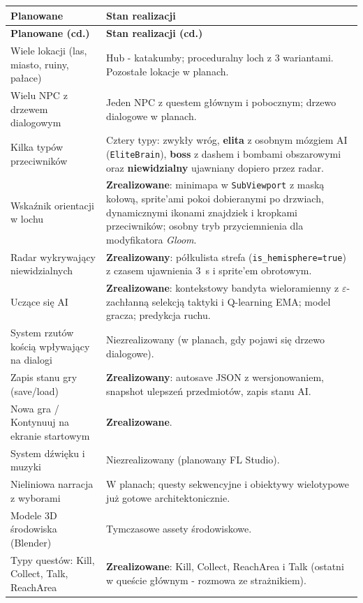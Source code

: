\begin{longtable}{|p{}|p{}|}
\hline
\textbf{Planowane} & \textbf{Stan realizacji} \\
\hline
\endfirsthead
\hline
\textbf{Planowane (cd.)} & \textbf{Stan realizacji (cd.)} \\
\hline
\endhead
\hline
\endfoot
Wiele lokacji (las, miasto, ruiny, pałace) & Hub - katakumby; proceduralny loch z 3 wariantami. Pozostałe lokacje w planach. \\
\hline
Wielu NPC z drzewem dialogowym & Jeden NPC z questem głównym i pobocznym; drzewo dialogowe w planach. \\
\hline
Kilka typów przeciwników & Cztery typy: zwykły wróg, \textbf{elita} z osobnym mózgiem AI (\texttt{EliteBrain}), \textbf{boss} z dashem i bombami obszarowymi oraz \textbf{niewidzialny} ujawniany dopiero przez radar. \\
\hline
Wskaźnik orientacji w lochu & \textbf{Zrealizowane}: minimapa w \texttt{SubViewport} z maską kołową, sprite'ami pokoi dobieranymi po drzwiach, dynamicznymi ikonami znajdziek i kropkami przeciwników; osobny tryb przyciemnienia dla modyfikatora \textit{Gloom}. \\
\hline
Radar wykrywający niewidzialnych & \textbf{Zrealizowany}: półkulista strefa (\texttt{is\_hemisphere=true}) z czasem ujawnienia 3~s i sprite'em obrotowym. \\
\hline
Uczące się AI & \textbf{Zrealizowane}: kontekstowy bandyta wieloramienny z $\varepsilon$-zachłanną selekcją taktyki i Q-learning EMA; model gracza; predykcja ruchu. \\
\hline
System rzutów kością wpływający na dialogi & Niezrealizowany (w planach, gdy pojawi się drzewo dialogowe). \\
\hline
Zapis stanu gry (save/load) & \textbf{Zrealizowany}: autosave JSON z wersjonowaniem, snapshot ulepszeń przedmiotów, zapis stanu AI. \\
\hline
Nowa gra / Kontynuuj na ekranie startowym & \textbf{Zrealizowane}. \\
\hline
System dźwięku i muzyki & Niezrealizowany (planowany FL Studio). \\
\hline
Nieliniowa narracja z wyborami & W planach; questy sekwencyjne i obiektywy wielotypowe już gotowe architektonicznie. \\
\hline
Modele 3D środowiska (Blender) & Tymczasowe assety środowiskowe. \\
\hline
Typy questów: Kill, Collect, Talk, ReachArea & \textbf{Zrealizowane}: Kill, Collect, ReachArea i Talk (ostatni w queście głównym - rozmowa ze strażnikiem). \\

\end{longtable}
